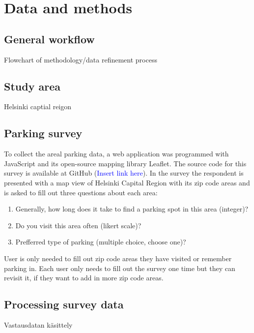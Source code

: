 \section{Data and methods}
\subsection{General workflow}
\justify
Flowchart of methodology/data refinement process

\subsection{Study area}
\justify
Helsinki captial reigon

\subsection{Parking survey}
\justify
To collect the areal parking data, a web application was programmed with JavaScript and its open-source mapping library Leaflet. The source code for this survey is available at GitHub (\textcolor{blue}{Insert link here}). In the survey the respondent is presented with a map view of Helsinki Capital Region with its zip code areas and is asked to fill out three questions about each area: 
\begin{spacing}{1}
\begin{enumerate}
  \item Generally, how long does it take to find a parking spot in this area (integer)?
  \item Do you visit this area often (likert scale)?
  \item Prefferred type of parking (multiple choice, choose one)?
\end{enumerate}
\end{spacing}

\noindent
User is only needed to fill out zip code areas they have visited or remember parking in. Each user only needs to fill out the survey one time but they can revisit it, if they want to add in more zip code areas.

\subsection{Processing survey data}
\justify
Vastausdatan käsittely